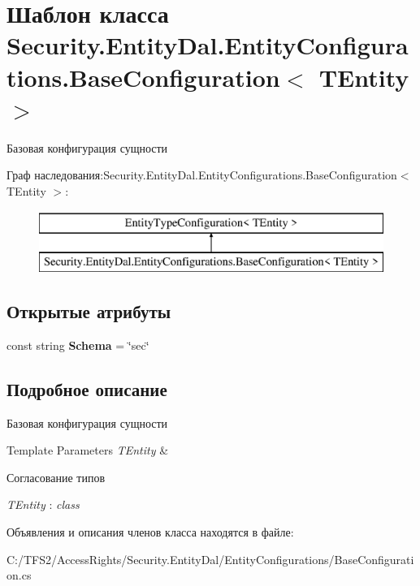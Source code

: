 \hypertarget{class_security_1_1_entity_dal_1_1_entity_configurations_1_1_base_configuration}{}\section{Шаблон класса Security.\+Entity\+Dal.\+Entity\+Configurations.\+Base\+Configuration$<$ T\+Entity $>$}
\label{class_security_1_1_entity_dal_1_1_entity_configurations_1_1_base_configuration}


Базовая конфигурация сущности  


Граф наследования\+:Security.\+Entity\+Dal.\+Entity\+Configurations.\+Base\+Configuration$<$ T\+Entity $>$\+:\begin{figure}[H]
\begin{center}
\leavevmode
\includegraphics[height=2.000000cm]{d6/da6/class_security_1_1_entity_dal_1_1_entity_configurations_1_1_base_configuration}
\end{center}
\end{figure}
\subsection*{Открытые атрибуты}
\begin{DoxyCompactItemize}
\item 
\mbox{\label{class_security_1_1_entity_dal_1_1_entity_configurations_1_1_base_configuration_a66201e2f29bab473b6c2485261fcf426}} 
const string {\bfseries Schema} = \char`\"{}sec\char`\"{}
\end{DoxyCompactItemize}


\subsection{Подробное описание}
Базовая конфигурация сущности 


\begin{DoxyTemplParams}{Template Parameters}
{\em T\+Entity} & \\
\hline
\end{DoxyTemplParams}
\begin{Desc}
\item[Согласование типов]\begin{description}
\item[{\em T\+Entity} : {\em class}]\end{description}
\end{Desc}


Объявления и описания членов класса находятся в файле\+:\begin{DoxyCompactItemize}
\item 
C\+:/\+T\+F\+S2/\+Access\+Rights/\+Security.\+Entity\+Dal/\+Entity\+Configurations/Base\+Configuration.\+cs\end{DoxyCompactItemize}
